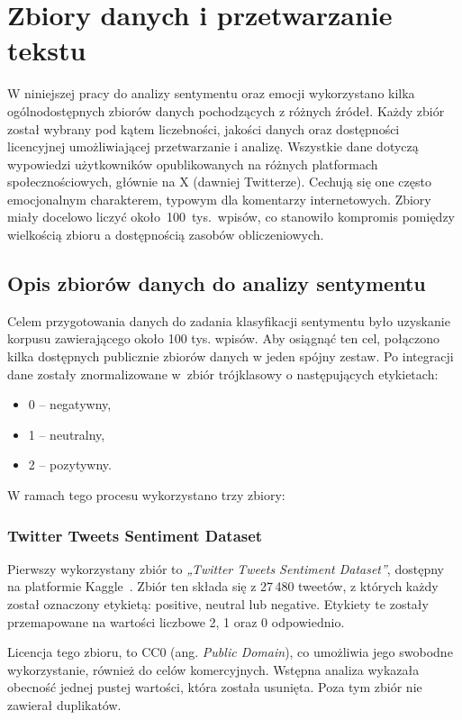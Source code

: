 \chapter{Zbiory danych i przetwarzanie tekstu}

W niniejszej pracy do analizy sentymentu oraz emocji wykorzystano kilka ogólnodostępnych zbiorów danych pochodzących z różnych źródeł. Każdy zbiór został wybrany pod kątem liczebności, jakości danych oraz dostępności licencyjnej umożliwiającej przetwarzanie i analizę. Wszystkie dane dotyczą wypowiedzi użytkowników opublikowanych na różnych platformach społecznościowych, głównie na X (dawniej Twitterze). Cechują się one często emocjonalnym charakterem, typowym dla komentarzy internetowych. Zbiory miały docelowo liczyć około~100~tys.~wpisów, co stanowiło kompromis pomiędzy wielkością zbioru a dostępnością zasobów obliczeniowych.

\section{Opis zbiorów danych do analizy sentymentu}

Celem przygotowania danych do zadania klasyfikacji sentymentu było uzyskanie korpusu zawierającego około 100 tys. wpisów. Aby osiągnąć ten cel, połączono kilka dostępnych publicznie zbiorów danych w jeden spójny zestaw. Po integracji dane zostały znormalizowane w~zbiór trójklasowy o następujących etykietach:
\begin{itemize}
    \item 0 -- negatywny,
    \item 1 -- neutralny,
    \item 2 -- pozytywny.
\end{itemize}

\vspace{5pt}
W ramach tego procesu wykorzystano trzy zbiory:

\subsection{Twitter Tweets Sentiment Dataset}

Pierwszy wykorzystany zbiór to \textit{„Twitter Tweets Sentiment Dataset”}, dostępny na platformie Kaggle~\cite{TTSD}. Zbiór ten składa się z 27\,480 tweetów, z których każdy został oznaczony etykietą: positive, neutral lub negative. Etykiety te zostały przemapowane na wartości liczbowe 2, 1 oraz 0 odpowiednio.

Licencja tego zbioru, to CC0 (ang. \textit{Public Domain}), co umożliwia jego swobodne wykorzystanie, również do celów komercyjnych. Wstępna analiza wykazała obecność jednej pustej wartości, która została usunięta. Poza tym zbiór nie zawierał duplikatów.

